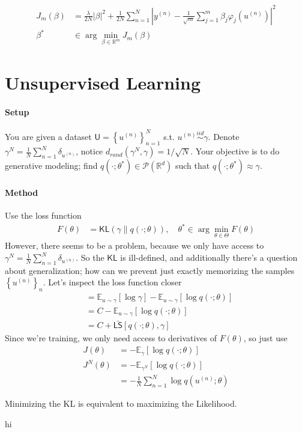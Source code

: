 \documentclass[11pt,fleqn]{article}
\numberwithin{equation}{section}
\theoremstyle{definition}
\theoremstyle{definition}
\begin{document}
\begin{align}
	J_m(\beta) & = \frac{\lambda}{2N} | \beta|^2 + \frac{1}{2N} \sum_{n=1}^N \left| y^{(n)} - \frac{1}{\sqrt{m}} \sum_{j=1}^m \beta_j \varphi_j(u^{(n)}) \right|^2\\
	\beta^* & \in \arg \min_{\beta \in \mathbb R^m} J_m(\beta)
\end{align}

\section{Unsupervised Learning}
\paragraph{Setup} You are given a dataset $\textsf{U} = \left\{ u^{(n)} \right\}_{n=1}^N$ s.t. $u^{(n)} \overset{iid}{\sim} \gamma$. Denote $\gamma^N = \frac{1}{N} \sum_{n=1}^N \delta_{u^{(n)}}$, notice $d_{rand}(\gamma^N , \gamma) = 1/\sqrt{N}$. Your objective is to do generative modeling; find $q(\cdot ; \theta^*) \in \mathcal P(\mathbb R^d)$ such that $q(\cdot ; \theta^*) \approx \gamma$. 

\paragraph{Method} Use the loss function
\begin{align}
	F(\theta) & = \textsf{KL}(\gamma \| q(\cdot; \theta)), \quad \theta^* \in \arg \min_{\theta \in \Theta} F(\theta)
\end{align}
However, there seems to be a problem, because we only have access to $\gamma^N = \frac{1}{N} \sum_{n=1}^N \delta_{u^{(n)}}$. So the $\textsf{KL}$ is ill-defined, and additionally there's a question about generalization; how can we prevent just exactly memorizing the samples $\left\{ u^{(n)} \right\}_n$. Let's inspect the loss function closer
\begin{align}
	& = \mathbb E_{u \sim \gamma}[\log \gamma] - \mathbb E_{u \sim \gamma}[\log q(\cdot; \theta)]\\
	& = C - \mathbb E_{u \sim \gamma}[\log q(\cdot; \theta)]\\
	& = C + \bar{\textsf{LS}}[q(\cdot ; \theta), \gamma]
\end{align}
Since we're training, we only need access to derivatives of $F(\theta)$, so just use 
\begin{align}
	J(\theta) & = - \mathbb E_{\gamma} [\log q(\cdot; \theta)]\\
	J^N(\theta) & = - \mathbb E_{\gamma^N} [\log q(\cdot;  \theta)] \\
	& = - \frac{1}{N} \sum_{n=1}^N \log q(u^{(n)} ; \theta)
\end{align}
\begin{fact}
	Minimizing the KL is equivalent to maximizing the Likelihood.
\end{fact}


















\newpage
hi
\end{document}
